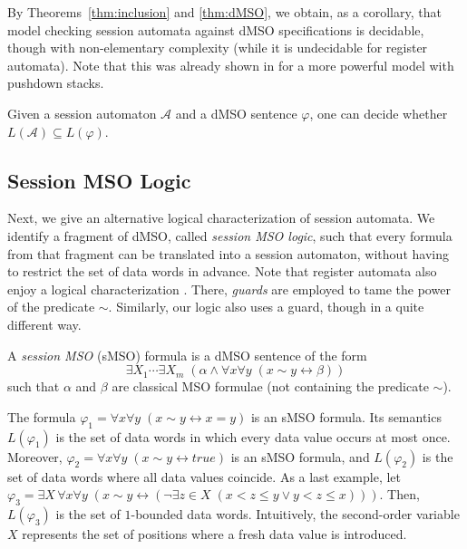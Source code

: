 \documentclass{LMCS}
\def\A{\mathcal A}
\renewcommand{\phi}{\varphi}
\newcommand{\ttrue}{\mathit{true}}
\newcommand{\runf}{\alpha}
\newcommand{\dataf}{\beta}
\begin{document}
By Theorems~\ref{thm:inclusion} and \ref{thm:dMSO}, we obtain, as a
corollary, that model checking session automata against dMSO
specifications is decidable, though with non-elementary complexity
(while it is undecidable for register
automata). Note that this was already shown in \cite{BCGK-fossacs12}
for a more powerful model with pushdown stacks. 

\begin{thm}
  Given a session automaton $\A$ and a dMSO sentence $\phi$, one can
  decide whether $L(\A) \subseteq L(\phi)$.
\end{thm}


\subsection{Session MSO Logic}\label{sec:sMSO}

Next, we give an alternative logical characterization of session
automata.  We identify a fragment of dMSO, called \emph{session MSO
  logic}, such that every formula from that fragment can be translated
into a session automaton, without having to restrict the set of data
words in advance.  Note that register automata also enjoy a logical
characterization \cite{Colcombet2011}.  There, \emph{guards} are
employed to tame the power of the predicate $\sim$. Similarly, our
logic also uses a guard, though in a quite different way.


\begin{defi}
  A \emph{session MSO} (sMSO) formula is a dMSO sentence of the form
  \[\exists X_1 \cdots \exists X_m\; (\runf \wedge \forall
  x\forall y\; (x \sim y \leftrightarrow \dataf))\] such that $\runf$
  and $\dataf$ are classical MSO formulae (not containing the
  predicate $\sim$).
\end{defi}

\begin{exa}
  The formula $\phi_1 = \forall x\forall y\; (x \sim y
  \leftrightarrow x = y)$ is an sMSO formula.  Its semantics
  $L(\phi_1)$ is the set of data words in which every data value
  occurs at most once.  Moreover, $\phi_2 = \forall x\forall y\; (x
  \sim y \leftrightarrow \ttrue)$ is an sMSO formula, and
  $L(\phi_2)$ is the set of data words where all data values
  coincide.  As a last example, let $\phi_3 = \exists X\, \forall
  x\forall y\;(x \sim y \leftrightarrow (\neg\exists z \in X\; (x < z
  \le y \vee y < z \le x)))$.  Then, $L(\phi_3)$ is the set of
  $1$-bounded data words. Intuitively, the second-order variable $X$
  represents the set of positions where a fresh data value is
  introduced.
\end{exa}
\end{document}
